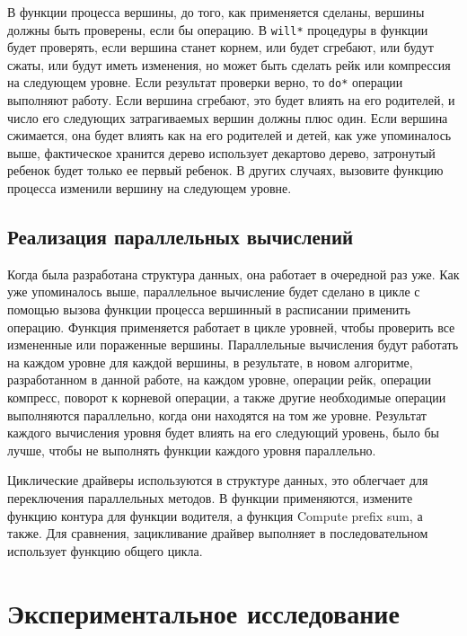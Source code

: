 \documentclass[specification,annotation]{itmo-student-thesis}
\newcommand{\revise}[1]{{\color{red!70!black} #1 }}
\begin{document}
\revise{
В функции процесса вершины, до того, как применяется сделаны, вершины должны быть проверены, если бы операцию. В \texttt{will{\textunderscore}*} процедуры в функции будет проверять, если вершина станет 
корнем, или будет сгребают, 
или будут сжаты, или будут иметь изменения, но может быть сделать рейк или компрессия на следующем уровне. Если результат проверки верно, то \texttt{do{\textunderscore}*} операции выполняют работу. Если 
вершина сгребают, 
это будет влиять на его родителей, и число его следующих затрагиваемых вершин должны плюс один. Если вершина сжимается, она будет влиять как на его родителей и детей, как уже упоминалось выше, фактическое 
хранится дерево использует декартово дерево, затронутый ребенок будет только ее первый ребенок. В других случаях, вызовите функцию процесса изменили вершину на следующем уровне.
}

\section{Реализация параллельных вычислений}

\revise{
Когда была разработана структура данных, она работает в очередной раз уже. Как уже упоминалось выше, параллельное вычисление будет сделано в цикле с помощью вызова функции процесса вершинный в расписании 
применить операцию. Функция применяется работает в цикле уровней, чтобы проверить все измененные или пораженные вершины. Параллельные вычисления будут работать на каждом уровне для каждой вершины, в 
результате, в новом алгоритме, разработанном в данной работе, на каждом уровне, операции рейк, операции компресс, поворот к корневой операции, а также другие необходимые операции выполняются параллельно, 
когда они находятся на том же уровне. Результат каждого вычисления уровня будет влиять на его следующий уровень, было бы лучше, чтобы не выполнять функции каждого уровня параллельно.
}

\revise{
Циклические драйверы используются в структуре данных, это облегчает для переключения параллельных методов. В функции применяются, измените функцию контура для функции водителя, а функция Compute prefix 
sum, а также. Для сравнения, зацикливание драйвер выполняет в последовательном использует функцию общего цикла.
}

\chapterconclusion

\chapter{Экспериментальное исследование}
\end{document}
